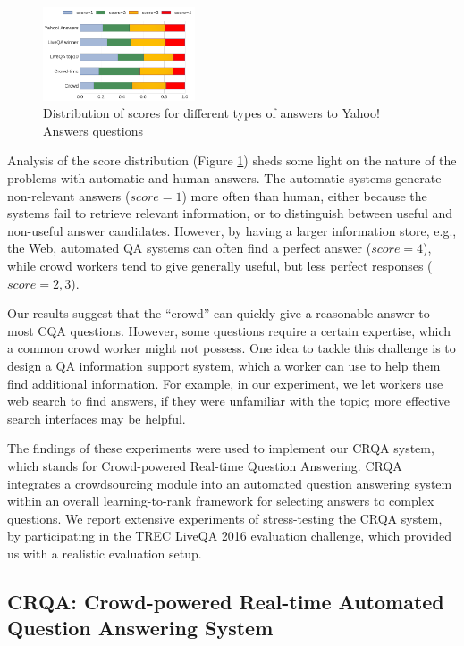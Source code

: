 \begin{figure}[h]
	\centering
	\includegraphics[width=0.4\textwidth]{img/scores_distribution}
	\caption{Distribution of scores for different types of answers to Yahoo! Answers questions}
	\label{figure:crowdsourcing:scores_distribution}
\end{figure}


Analysis of the score distribution (Figure \ref{figure:crowdsourcing:scores_distribution}) sheds some light on the nature of the problems with automatic and human answers. The automatic systems generate non-relevant answers ($score=1$) more often than human, either because the systems fail to retrieve relevant information, or to distinguish between useful and non-useful answer candidates. However, by having a larger information store, e.g., the Web, automated QA systems can often find a perfect answer ($score=4$), while crowd workers tend to give generally useful, but less perfect responses ($score=2,3$).

Our results suggest that the ``crowd'' can quickly give a reasonable answer to most CQA questions. However, some questions require a certain expertise, which a common crowd worker might not possess.
One idea to tackle this challenge is to design a QA information support system, which a worker can use to help them find additional information.
For example, in our experiment, we let workers use web search to find answers, if they were unfamiliar with the topic; more effective search interfaces may be helpful.

The findings of these experiments were used to implement our CRQA system, which stands for Crowd-powered Real-time Question Answering.
CRQA integrates a crowdsourcing module into an automated question answering system within an overall learning-to-rank framework for selecting answers to complex questions.
We report extensive experiments of stress-testing the CRQA system, by participating in the TREC LiveQA 2016 evaluation challenge, which provided us with a realistic evaluation setup.


\subsection{CRQA: Crowd-powered Real-time Automated Question Answering System}
\label{section:crowdsourcing:approach:crqa}

